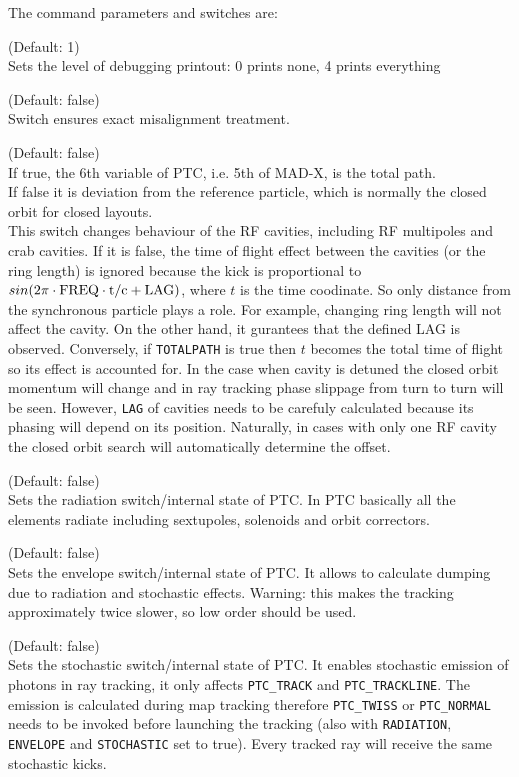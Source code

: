 The command parameters and switches are:
\begin{madlist}
	 (Default: 1)\\
	Sets the level of debugging printout: 0 prints none, 4 prints everything

	 (Default: false)\\
	Switch ensures exact misalignment treatment.

	 (Default: false)\\
	If true, the 6th variable of PTC, i.e. 5th of MAD-X, is the total path.  \\
	If false it is deviation from the reference particle,
	which is normally the closed orbit for closed layouts. \\
	This switch changes behaviour of the RF cavities,
	including RF multipoles and crab cavities.
	If it is false, the time of flight effect between the cavities
	(or the ring length) is ignored because the kick is proportional to \\
	$sin(2\pi \cdot \rm{FREQ} \cdot t/c + \rm{LAG})$, where $t$ is the time coodinate.
	So only distance from the synchronous particle plays a role.
	For example, changing ring length will not affect the cavity.
	On the other hand, it gurantees that the defined LAG is observed.
	Conversely, if \texttt{TOTALPATH} is true then $t$ becomes the total time of flight
	so its effect is accounted for. In the case when cavity is detuned
	the closed orbit momentum will change and in ray tracking phase slippage from turn
	to turn will be seen. However, \texttt{LAG} of cavities needs to be
	carefuly calculated because its phasing will depend on its position.
	Naturally, in cases with only one RF cavity the closed orbit search will automatically
	determine the offset.

	 (Default: false)\\
	Sets the radiation switch/internal state of PTC. In PTC basically all the elements
	radiate including sextupoles, solenoids and orbit correctors.

	 (Default: false)\\
	Sets the envelope switch/internal state of PTC. It allows to calculate
	dumping due to radiation and stochastic effects.
	Warning: this makes the tracking approximately twice slower, so low order
	should be used.

	 (Default: false)\\
	Sets the stochastic switch/internal state of PTC.
	It enables stochastic emission of photons in ray tracking,
                    it only affects \texttt{PTC\_TRACK} and \texttt{PTC\_TRACKLINE}.
	The emission is calculated during map tracking therefore
	\texttt{PTC\_TWISS} or \texttt{PTC\_NORMAL}
	needs to be invoked before launching the tracking
	(also with \texttt{RADIATION}, \texttt{ENVELOPE} and \texttt{STOCHASTIC} set to true).
	Every tracked ray will receive the same stochastic kicks.


\end{madlist}
